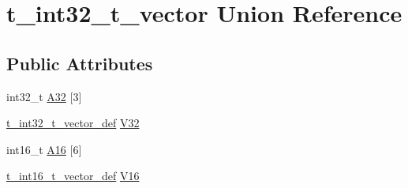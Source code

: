 \hypertarget{uniont__int32__t__vector}{\section{t\-\_\-int32\-\_\-t\-\_\-vector Union Reference}
\label{uniont__int32__t__vector}
}
\subsection*{Public Attributes}
\begin{DoxyCompactItemize}
\item 
int32\-\_\-t \hyperlink{uniont__int32__t__vector_a8abb634c0688eea7ed99fed47a0d602b}{A32} \mbox{[}3\mbox{]}
\item 
\hyperlink{structt__int32__t__vector__def}{t\-\_\-int32\-\_\-t\-\_\-vector\-\_\-def} \hyperlink{uniont__int32__t__vector_a7b266851a313a5836f7a4724523bef60}{V32}
\item 
int16\-\_\-t \hyperlink{uniont__int32__t__vector_af868e3eb6d6d95b59f6eed8fd5ccf4b7}{A16} \mbox{[}6\mbox{]}
\item 
\hyperlink{structt__int16__t__vector__def}{t\-\_\-int16\-\_\-t\-\_\-vector\-\_\-def} \hyperlink{uniont__int32__t__vector_a2a3cdb59dbae64449de64254d0fc122a}{V16}
\end{DoxyCompactItemize}


